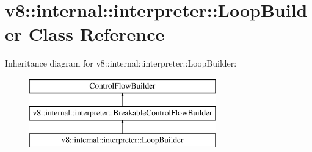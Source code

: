 \hypertarget{classv8_1_1internal_1_1interpreter_1_1_loop_builder}{}\section{v8\+:\+:internal\+:\+:interpreter\+:\+:Loop\+Builder Class Reference}
\label{classv8_1_1internal_1_1interpreter_1_1_loop_builder}
Inheritance diagram for v8\+:\+:internal\+:\+:interpreter\+:\+:Loop\+Builder\+:\begin{figure}[H]
\begin{center}
\leavevmode
\includegraphics[height=3.000000cm]{classv8_1_1internal_1_1interpreter_1_1_loop_builder}
\end{center}
\end{figure}
